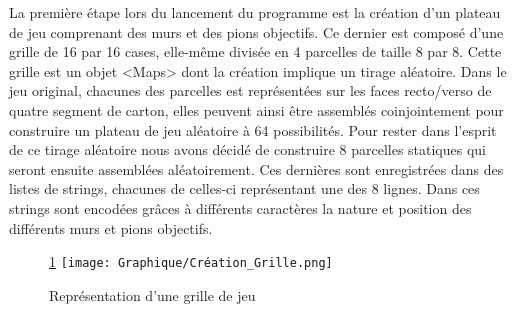 \documentclass{rapportECL}
\begin{document}
La première étape lors du lancement du programme est la création d'un plateau de jeu comprenant des murs et des pions objectifs. Ce dernier est composé d'une grille de 16 par 16 cases, elle-même divisée en 4 parcelles de taille 8 par 8. Cette grille est un objet <Maps> dont la création implique un tirage aléatoire.
\newline
Dans le jeu original, chacunes des parcelles est représentées sur les faces recto/verso de quatre segment de carton, elles peuvent ainsi être assemblés coinjointement pour construire un plateau de jeu aléatoire à 64 possibilités.
\newline
\newline
Pour rester dans l'esprit de ce tirage aléatoire nous avons décidé de construire 8 parcelles statiques qui seront ensuite assemblées aléatoirement. Ces dernières sont enregistrées dans des listes de strings, chacunes de celles-ci représentant une des 8 lignes. Dans ces strings sont encodées grâces à différents caractères la nature et position des différents murs et pions objectifs.

\begin{figure}[h]
    \centering
    \ref{Fig2} 
    \texttt{[image: Graphique/Création\_Grille.png]}
    \caption{Représentation d'une grille de jeu}
    \label{Fig2}
\end{figure}
\end{document}
